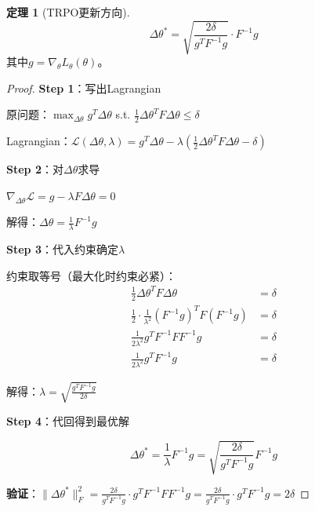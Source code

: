 \documentclass[11pt,a4paper]{article}
\theoremstyle{definition}
\newtheorem{theorem}{定理}[section]
\begin{document}
\begin{theorem}[TRPO更新方向]
\[
\Delta\theta^* = \sqrt{\frac{2\delta}{g^T F^{-1} g}} \cdot F^{-1} g
\]
其中$g = \nabla_\theta L_\theta(\theta)$。
\end{theorem}

\begin{proof}
\textbf{Step 1}：写出Lagrangian

原问题：$\max_{\Delta\theta} g^T \Delta\theta$ s.t. $\frac{1}{2}\Delta\theta^T F \Delta\theta \leq \delta$

Lagrangian：$\mathcal{L}(\Delta\theta, \lambda) = g^T \Delta\theta - \lambda\left(\frac{1}{2}\Delta\theta^T F \Delta\theta - \delta\right)$

\textbf{Step 2}：对$\Delta\theta$求导

$\nabla_{\Delta\theta} \mathcal{L} = g - \lambda F \Delta\theta = 0$

解得：$\Delta\theta = \frac{1}{\lambda} F^{-1} g$

\textbf{Step 3}：代入约束确定$\lambda$

约束取等号（最大化时约束必紧）：
\begin{align*}
\frac{1}{2} \Delta\theta^T F \Delta\theta &= \delta \\
\frac{1}{2} \cdot \frac{1}{\lambda^2} (F^{-1}g)^T F (F^{-1}g) &= \delta \\
\frac{1}{2\lambda^2} g^T F^{-1} F F^{-1} g &= \delta \\
\frac{1}{2\lambda^2} g^T F^{-1} g &= \delta
\end{align*}

解得：$\lambda = \sqrt{\frac{g^T F^{-1} g}{2\delta}}$

\textbf{Step 4}：代回得到最优解

\[
\Delta\theta^* = \frac{1}{\lambda} F^{-1} g = \sqrt{\frac{2\delta}{g^T F^{-1} g}} F^{-1} g
\]

\textbf{验证}：$\|\Delta\theta^*\|_F^2 = \frac{2\delta}{g^T F^{-1} g} \cdot g^T F^{-1} F F^{-1} g = \frac{2\delta}{g^T F^{-1}g} \cdot g^T F^{-1} g = 2\delta$ \checkmark
\end{proof}
\end{document}
